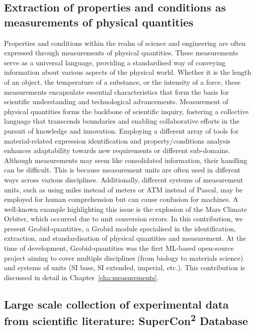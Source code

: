 \subsection{Extraction of properties and conditions as measurements of physical quantities}
\label{sec:intro-ner-quantities}

Properties and conditions within the realm of science and engineering are often expressed through measurements of physical quantities. These measurements serve as a universal language, providing a standardised way of conveying information about various aspects of the physical world. Whether it is the length of an object, the temperature of a substance, or the intensity of a force, these measurements encapsulate essential characteristics that form the basis for scientific understanding and technological advancements.
Measurement of physical quantities forms the backbone of scientific inquiry, fostering a collective language that transcends boundaries and enabling collaborative efforts in the pursuit of knowledge and innovation.
Employing a different array of tools for material-related expression identification and property/conditions analysis enhances adaptability towards new requirements or different sub-domains.
Although measurements may seem like consolidated information, their handling can be difficult. This is because measurement units are often used in different ways across various disciplines. Additionally, different systems of measurement units, such as using miles instead of meters or ATM instead of Pascal, may be employed for human comprehension but can cause confusion for machines. A well-known example highlighting this issue is the explosion of the Mars Climate Orbiter, which occurred due to unit conversion errors.
In this contribution, we present Grobid-quantities, a Grobid module specialised in the identification, extraction, and standardisation of physical quantities and measurement. At the time of development, Grobid-quantities was the first ML-based open-source project aiming to cover multiple disciplines (from biology to materials science) and systems of units (SI base, SI extended, imperial, etc.). 
This contribution is discussed in detail in Chapter~\ref{cha:measurements}.


\subsection{Large scale collection of experimental data from scientific literature: SuperCon\texorpdfstring{\textsuperscript{2}}{2} Database}
\label{sec:intro-supercon2}


